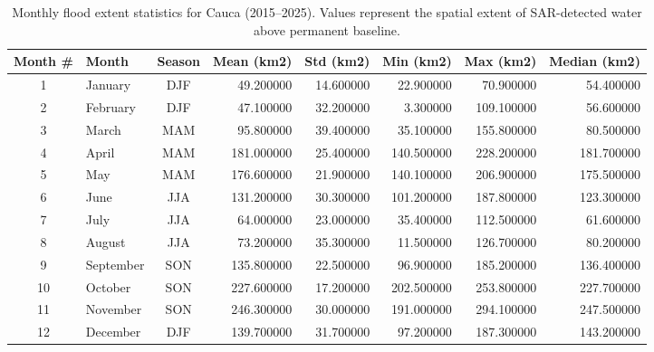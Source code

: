 \begin{table}[htbp]
\caption{Monthly flood extent statistics for Cauca (2015--2025). Values represent the spatial extent of SAR-detected water above permanent baseline.}
\label{tab:seasonal_dynamics}
\begin{tabular}{clcrrrrr}
\toprule
Month \# & Month & Season & Mean (km2) & Std (km2) & Min (km2) & Max (km2) & Median (km2) \\
\midrule
1 & January & DJF & 49.200000 & 14.600000 & 22.900000 & 70.900000 & 54.400000 \\
2 & February & DJF & 47.100000 & 32.200000 & 3.300000 & 109.100000 & 56.600000 \\
3 & March & MAM & 95.800000 & 39.400000 & 35.100000 & 155.800000 & 80.500000 \\
4 & April & MAM & 181.000000 & 25.400000 & 140.500000 & 228.200000 & 181.700000 \\
5 & May & MAM & 176.600000 & 21.900000 & 140.100000 & 206.900000 & 175.500000 \\
6 & June & JJA & 131.200000 & 30.300000 & 101.200000 & 187.800000 & 123.300000 \\
7 & July & JJA & 64.000000 & 23.000000 & 35.400000 & 112.500000 & 61.600000 \\
8 & August & JJA & 73.200000 & 35.300000 & 11.500000 & 126.700000 & 80.200000 \\
9 & September & SON & 135.800000 & 22.500000 & 96.900000 & 185.200000 & 136.400000 \\
10 & October & SON & 227.600000 & 17.200000 & 202.500000 & 253.800000 & 227.700000 \\
11 & November & SON & 246.300000 & 30.000000 & 191.000000 & 294.100000 & 247.500000 \\
12 & December & DJF & 139.700000 & 31.700000 & 97.200000 & 187.300000 & 143.200000 \\
\bottomrule
\end{tabular}
\end{table}

